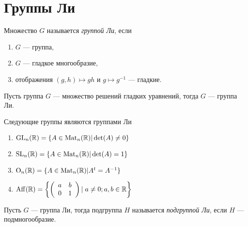 \section{Группы Ли}

\begin{defi}
Множество $G$ называется \textit{группой Ли}, если
\begin{enumerate}
\item $G$ — группа,
\item $G$ — гладкое многообразие,
\item отображения $(g,h)\mapsto gh$ и $g\mapsto g^{-1}$ — гладкие.
\end{enumerate}
\end{defi}

\begin{ass}
Пусть группа $G$ — множество решений гладких уравнений, тогда $G$ — группа Ли.
\end{ass}

\begin{examples} Следующие группы являются группами Ли
\begin{enumerate}
\item $\operatorname{GL}_n(\mathbb{R})=\{A\in \operatorname{Mat}_n(\mathbb{R})|\det(A)\neq 0\}$
\item $\operatorname{SL}_n(\mathbb{R})=\{A\in\operatorname{Mat}_n(\mathbb{R})|\det(A) = 1\}$
\item $\operatorname{O}_n(\mathbb{R})=\{A\in\operatorname{Mat}_n(\mathbb{R})|A^t=A^{-1}\}$
\item $\operatorname{Aff}(\mathbb{R})=\left\{\left(\begin{array}{cc}a & b \\0 & 1\end{array}\right)\left|\right.a\neq0;a,b\in\mathbb{R}\right\}$
\end{enumerate}
\end{examples}

\begin{defi}
Пусть $G$ — группа Ли, тогда подгруппа $H$ называется \textit{подгруппой Ли}, если $H$ — подмногообразие.
\end{defi}
